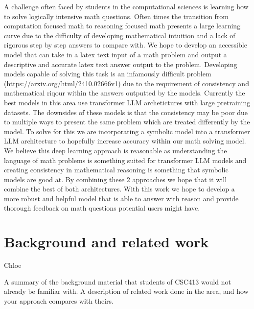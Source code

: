 \documentclass{article}
\begin{document}
A challenge often faced by students in the computational sciences is learning how to solve logically intensive math questions. Often times the transition from computation focused math to reasoning focused math presents a large learning curve due to the difficulty of developing mathematical intuition and a lack of rigorous step by step answers to compare with. We hope to develop an accessible model that can take in a latex text input of a math problem and output a descriptive and accurate latex text answer output to the problem. Developing models capable of solving this task is an infamously difficult problem (https://arxiv.org/html/2410.02666v1) due to the requirement of consistency and mathematical riqour within the answers outputted by the models. Currently the best models in this area use transformer LLM archetictures with large pretraining datasets. The downsides of these models is that the consistency may be poor due to multiple ways to present the same problem which are treated differently by the model. To solve for this we are incorporating a symbolic model into a transformer LLM architecture to hopefully increase accuracy within our math solving model. We believe this deep learning approach is reasonable as understanding the language of math problems is something suited for transformer LLM models and creating consistency in mathematical reasoning is something that symbolic models are good at. By combining these 2 approaches we hope that it will combine the best of both architectures.  With this work we hope to develop a more robust and helpful model that is able to answer with reason and provide thorough feedback on math questions potential users might have.

\section{Background and related work}
Chloe

A summary of the background material that students of
CSC413 would not already be familiar with. A
description of related work done in the area, and how
your approach compares with theirs.
\end{document}
